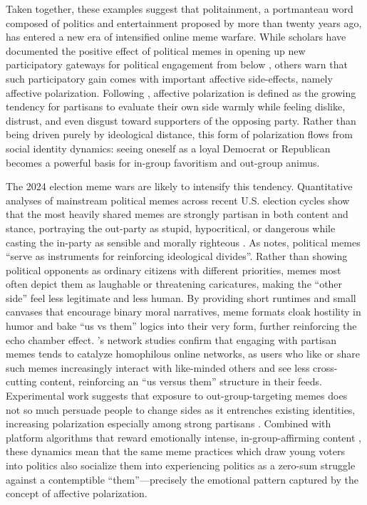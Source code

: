 \documentclass[12pt,twoside]{article}
\begin{document}

Taken together, these examples suggest that politainment, a portmanteau word composed of politics and entertainment proposed by \textcite{doerner2001politainment} more than twenty years ago, has entered a new era of intensified online meme warfare. While scholars have documented the positive effect of political memes in opening up new participatory gateways for political engagement from below \parencite{sreekumar2013onlinepoliticalmemes, ahmed2024breakingbarriersmemes, mushtaq2025betweenhumorharm}, others warn that such participatory gain comes with important affective side-effects, namely affective polarization. Following \textcite{iyengar2012affectnotideology,iyengar2015fearloathing,iyengar2019originsaffectivepolarization}, affective polarization is defined as the growing tendency for partisans to evaluate their own side warmly while feeling dislike, distrust, and even disgust toward supporters of the opposing party. Rather than being driven purely by ideological distance, this form of polarization flows from social identity dynamics: seeing oneself as a loyal Democrat or Republican becomes a powerful basis for in-group favoritism and out-group animus. 

The 2024 election meme wars are likely to intensify this tendency. Quantitative analyses of mainstream political memes across recent U.S. election cycles show that the most heavily shared memes are strongly partisan in both content and stance, portraying the out-party as stupid, hypocritical, or dangerous while casting the in-party as sensible and morally righteous \parencite{collier2024compositionmainstreammemes}. As \textcite{alafnan2025roleMemesPoliticalDiscourse} notes, political memes ``serve as instruments for reinforcing ideological divides''. Rather than showing political opponents as ordinary citizens with different priorities, memes most often depict them as laughable or threatening caricatures, making the “other side” feel less legitimate and less human. By providing short runtimes and small canvases that encourage binary moral narratives, meme formats cloak hostility in humor and bake ``us vs them'' logics into their very form, further reinforcing the echo chamber effect. \textcite{kim2023partisanmemes}'s network studies confirm that engaging with partisan memes tends to catalyze homophilous online networks, as users who like or share such memes increasingly interact with like-minded others and see less cross-cutting content, reinforcing an “us versus them” structure in their feeds. Experimental work suggests that exposure to out-group-targeting memes does not so much persuade people to change sides as it entrenches existing identities, increasing polarization especially among strong partisans \parencite{galipeau2023impactpoliticalmemes}. Combined with platform algorithms that reward emotionally intense, in-group-affirming content \parencite{ye2025auditingexposurebias}, these dynamics mean that the same meme practices which draw young voters into politics also socialize them into experiencing politics as a zero-sum struggle against a contemptible “them”---precisely the emotional pattern captured by the concept of affective polarization.
\end{document}
